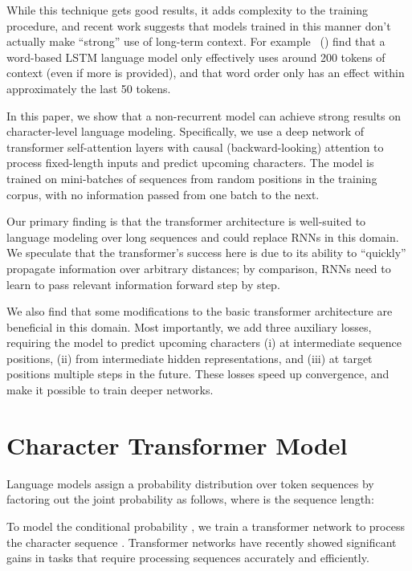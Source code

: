 \documentclass[letterpaper]{article}
\newcommand{\newcite}[1]{\citeauthor{#1}~(\citeyear{#1})}
\begin{document}
While this technique gets good results, it adds complexity to the training procedure, and recent work suggests that models trained in this manner don't actually make ``strong'' use of long-term context.
For example \newcite{khandelwal2018lm} find that a word-based LSTM language model only effectively uses around 200 tokens of context (even if more is provided), and that word order only has an effect within approximately the last 50 tokens.


In this paper, we show that a non-recurrent model can achieve strong results on character-level language modeling.
Specifically, we use a deep network of transformer self-attention layers \cite{NIPS2017_7181} with causal (backward-looking) attention to process fixed-length inputs and predict upcoming characters.
The model is trained on mini-batches of sequences from random positions in the training corpus, with no information passed from one batch to the next.

Our primary finding is that the transformer architecture is well-suited to language modeling over long sequences and could replace RNNs in this domain.
We speculate that the transformer's success here is due to its ability to ``quickly'' propagate information over arbitrary distances; by comparison, RNNs need to learn to pass relevant information forward step by step.

We also find that some modifications to the basic transformer architecture are beneficial in this domain.
Most importantly, we add three auxiliary losses, requiring the model to predict upcoming characters (i) at intermediate sequence positions, (ii) from intermediate hidden representations, and (iii) at target positions multiple steps in the future.
These losses speed up convergence, and make it possible to train deeper networks.



\section{Character Transformer Model}

Language models assign a probability distribution over token sequences  by factoring out the joint probability as follows, where  is the sequence length:



To model the conditional probability , we train a transformer network to process the character sequence .
Transformer networks have recently showed significant gains in tasks that require processing sequences accurately and efficiently.
\end{document}
